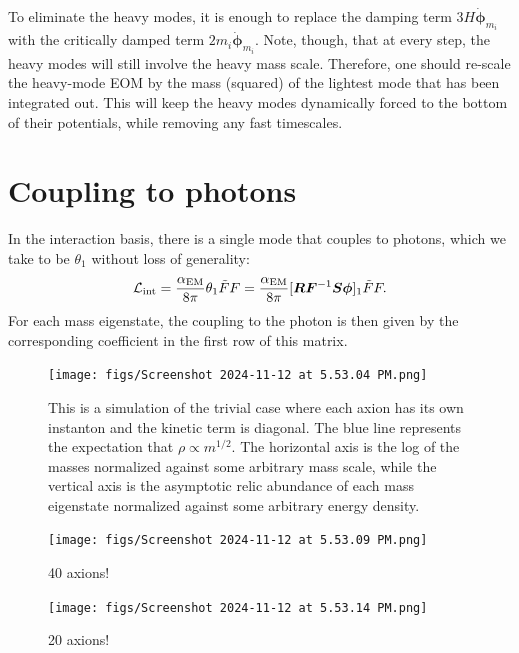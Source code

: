 \documentclass{article}
\begin{document}
To eliminate the heavy modes, it is enough to replace the damping term $3 H \dot{\bm \phi}_{m_i}$ with the critically damped term $2m_i\dot{\bm \phi}_{m_i}$. Note, though, that at every step, the heavy modes will still involve the heavy mass scale. Therefore, one should re-scale the heavy-mode EOM by the mass (squared) of the lightest mode that has been integrated out. This will keep the heavy modes dynamically forced to the bottom of their potentials, while removing any fast timescales.

\section{Coupling to photons}
In the interaction basis, there is a single mode that couples to photons, which we take to be $\theta_1$ without loss of generality:
\begin{align}
    {\cal L}_{\rm int} = \frac{\alpha_{\rm EM}}{8\pi}\theta_1\tilde F F =\frac{\alpha_{\rm EM}}{8\pi} [\bm R\bm F^{-1}\bm S \bm \phi]_1 \tilde F F.
\end{align}
For each mass eigenstate, the coupling to the photon is then given by the corresponding coefficient in the first row of this matrix.

\begin{figure}
    \centering
    \texttt{[image: figs/Screenshot 2024-11-12 at 5.53.04 PM.png]}
    \caption{This is a simulation of the trivial case where each axion has its own instanton and the kinetic term is diagonal. The blue line represents the expectation that $\rho\propto m^{1/2}$. The horizontal axis is the log of the masses normalized against some arbitrary mass scale, while the vertical axis is the asymptotic relic abundance of each mass eigenstate normalized against some arbitrary energy density.}
    \label{fig:enter-label}
\end{figure}
\begin{figure}
    \centering
    \texttt{[image: figs/Screenshot 2024-11-12 at 5.53.09 PM.png]}
    \caption{40 axions!}
    \label{fig:enter-label}
\end{figure}
\begin{figure}
    \centering
    \texttt{[image: figs/Screenshot 2024-11-12 at 5.53.14 PM.png]}
    \caption{20 axions!}
    \label{fig:enter-label}
\end{figure}
\end{document}

